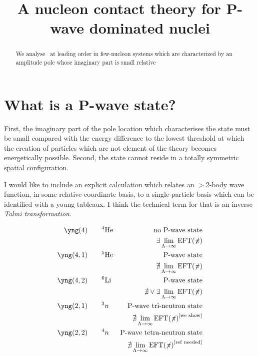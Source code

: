 \documentclass[aps,prd,twocolumn
,tightenlines,letterpaper,
nofootinbib]{revtex4-1}
\begin{document}
 
\title{
A nucleon contact theory for P-wave dominated nuclei
} 

\begin{abstract}
We analyse \eftnopi~at leading order in few-nucleon systems which are
characterized by an amplitude pole whose imaginary part is small relative
\end{abstract}

 
\maketitle

\section{What is a P-wave state?}
First, the imaginary part of the pole location which characterises the state
must be small compared with the energy difference to the lowest threshold
at which the creation of particles which are not element of the theory
becomes energetically possible. Second, the state cannot reside in a totally
symmetric spatial configuration. \begin{ecce}I would like to include an explicit calculation
which relates an $>2$-body wave function, in some relative-coordinate basis, to a single-particle
basis which can be identified with a young tableaux. I think the technical term for that
is an inverse {\it Talmi transformation}.\end{ecce}

\begin{align*}
\yng(4) &\qquad \he{4} & \text{no P-wave state}\\
 &&{\exists}\lim_{\Lambda\to\infty}\eftnopi\\
\yng(4,1) &\qquad \he{5} & \text{P-wave state}\\
 &&\slashed{\exists}\lim_{\Lambda\to\infty}\eftnopi\\
\yng(4,2) &\qquad \li{6} & \text{P-wave state}\\
 &&\slashed{\exists}\vee{\exists}\lim_{\Lambda\to\infty}\eftnopi\\
 \yng(2,1) &\qquad {}^3n & \text{P-wave tri-neutron state}\\
 &&\slashed{\exists}\lim_{\Lambda\to\infty}\eftnopi^{\text{[we show]}}\\
  \yng(2,2) &\qquad {}^4n & \text{P-wave tetra-neutron state}\\
 &&\slashed{\exists}\lim_{\Lambda\to\infty}\eftnopi^{[\text{ref needed]}}\\
\end{align*}
\end{document}
